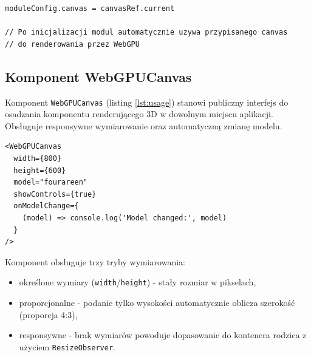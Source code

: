 \begin{lstlisting}[style=javascript, caption={Przypisanie canvas do modułu}, label={lst:canvas}]
moduleConfig.canvas = canvasRef.current

// Po inicjalizacji modul automatycznie uzywa przypisanego canvas
// do renderowania przez WebGPU
\end{lstlisting}

\subsection{Komponent WebGPUCanvas}

Komponent \texttt{WebGPUCanvas} (listing \ref{lst:usage}) stanowi publiczny interfejs do osadzania komponentu renderującego 3D w dowolnym miejscu aplikacji. Obsługuje responsywne wymiarowanie oraz automatyczną zmianę modelu.

\begin{lstlisting}[style=javascript, caption={Użycie komponentu WebGPUCanvas}, label={lst:usage}]
<WebGPUCanvas
  width={800}
  height={600}
  model="fourareen"
  showControls={true}
  onModelChange={
    (model) => console.log('Model changed:', model)
  }
/>
\end{lstlisting}

Komponent obsługuje trzy tryby wymiarowania:
\begin{itemize}
  \item określone wymiary (\texttt{width}/\texttt{height}) - stały rozmiar w pikselach,
  \item proporcjonalne - podanie tylko wysokości automatycznie oblicza szerokość (proporcja 4:3),
  \item responsywne - brak wymiarów powoduje dopasowanie do kontenera rodzica z użyciem \texttt{ResizeObserver}.
\end{itemize}
